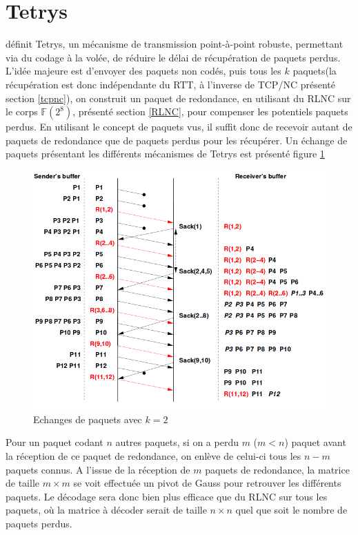 \documentclass[frenchb]{article}
\begin{document}
\section{Tetrys}
\cite{onthefly} définit Tetrys, un mécanisme de transmission point-à-point robuste, permettant via du codage à la volée, de réduire le délai de récupération de paquets perdus. L'idée majeure est d'envoyer des paquets non codés, puis tous les $k$ paquets(la récupération est donc indépendante du RTT, à l'inverse de TCP/NC présenté section \ref{tcpnc}), on construit un paquet de redondance, en utilisant du RLNC sur le corps $\mathbb{F}(2^8)$, présenté section \ref{RLNC}, pour compenser les potentiels paquets perdus. En utilisant le concept de paquets vus, il suffit donc de recevoir autant de paquets de redondance que de paquets perdus pour les récupérer. Un échange de paquets présentant les différents mécanismes de Tetrys est présenté figure \ref{tetrys}

\begin{figure}[H]
  \centering
  \includegraphics[scale=0.5]{img/Tetrys.png}
  \caption{Echanges de paquets avec $k=2$}
  \label{tetrys}
\end{figure}


Pour un paquet codant $n$ autres paquets, si on a perdu $m$ ($m<n$) paquet avant la réception de ce paquet de redondance, on enlève de celui-ci tous les $n-m$ paquets connus. A l'issue de la réception de $m$ paquets de redondance, la matrice de taille $m\times m$ se voit effectuée un pivot de Gauss pour retrouver les différents paquets. Le décodage sera donc bien plus efficace que du RLNC sur tous les paquets, où la matrice à décoder serait de taille $n\times n$ quel que soit le nombre de paquets perdus. 
\end{document}
